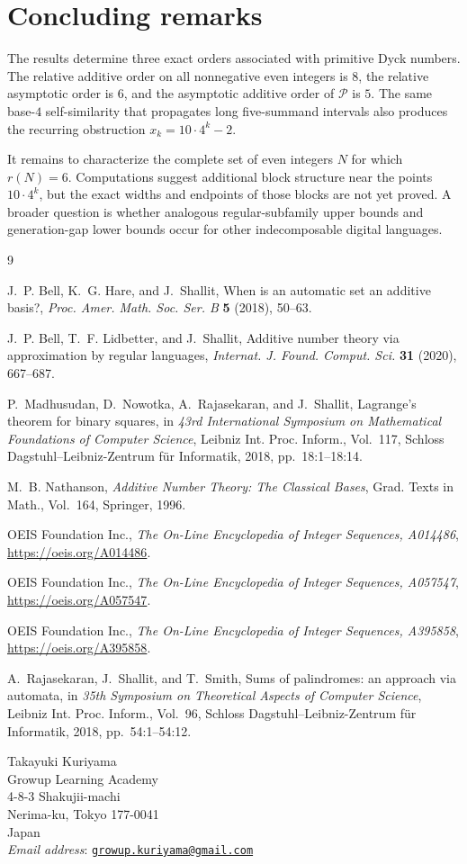 \documentclass[12pt]{article}
\theoremstyle{plain}
\theoremstyle{definition}
\theoremstyle{plain}
\newcommand{\Pset}{\mathcal{P}}
\begin{document}
\section{Concluding remarks}

The results determine three exact orders associated with primitive Dyck
numbers.  The relative additive order on all nonnegative even integers is
$8$, the relative asymptotic order is $6$, and the asymptotic additive order of
$\Pset$ is $5$.  The same base-$4$ self-similarity that propagates long
five-summand intervals also produces the recurring obstruction
$x_k=10\cdot4^k-2$.

It remains to characterize the complete set of even integers $N$ for which
$r(N)=6$.  Computations suggest additional block structure near the points
$10\cdot4^k$, but the exact widths and endpoints of those blocks are not yet
proved.  A broader question is whether analogous regular-subfamily upper
bounds and generation-gap lower bounds occur for other indecomposable digital
languages.

\begin{thebibliography}{9}

J.~P. Bell, K.~G. Hare, and J.~Shallit,
When is an automatic set an additive basis?,
\emph{Proc. Amer. Math. Soc. Ser. B} \textbf{5} (2018), 50--63.

J.~P. Bell, T.~F. Lidbetter, and J.~Shallit,
Additive number theory via approximation by regular languages,
\emph{Internat. J. Found. Comput. Sci.} \textbf{31} (2020), 667--687.

P.~Madhusudan, D.~Nowotka, A.~Rajasekaran, and J.~Shallit,
Lagrange's theorem for binary squares,
in \emph{43rd International Symposium on Mathematical Foundations of
Computer Science}, Leibniz Int. Proc. Inform., Vol.~117, Schloss
Dagstuhl--Leibniz-Zentrum f{\"u}r Informatik, 2018, pp.~18:1--18:14.

M.~B. Nathanson,
\emph{Additive Number Theory: The Classical Bases},
Grad. Texts in Math., Vol.~164, Springer, 1996.

OEIS Foundation Inc.,
\emph{The On-Line Encyclopedia of Integer Sequences, A014486},
\url{https://oeis.org/A014486}.

OEIS Foundation Inc.,
\emph{The On-Line Encyclopedia of Integer Sequences, A057547},
\url{https://oeis.org/A057547}.

OEIS Foundation Inc.,
\emph{The On-Line Encyclopedia of Integer Sequences, A395858},
\url{https://oeis.org/A395858}.

A.~Rajasekaran, J.~Shallit, and T.~Smith,
Sums of palindromes: an approach via automata,
in \emph{35th Symposium on Theoretical Aspects of Computer Science},
Leibniz Int. Proc. Inform., Vol.~96, Schloss Dagstuhl--Leibniz-Zentrum
f{\"u}r Informatik, 2018, pp.~54:1--54:12.

\end{thebibliography}


\begin{flushleft}
Takayuki Kuriyama\\
Growup Learning Academy\\
4-8-3 Shakujii-machi\\
Nerima-ku, Tokyo 177-0041\\
Japan\\
\textit{Email address}: \href{mailto:growup.kuriyama@gmail.com}
{\texttt{growup.kuriyama@gmail.com}}
\end{flushleft}
\end{document}

